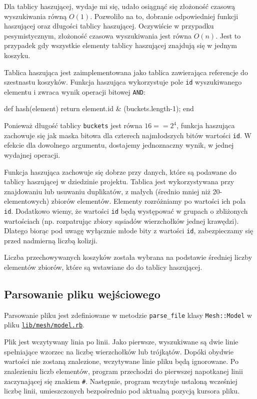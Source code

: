 \documentclass[10pt,a4paper]{article}
\newcommand{\f}[1]{\texttt{#1}}
\newcommand{\rev}{754330aa66a33e7434e6bda5c083aa3e12b7b65f}
\newcommand{\revhref}[1] {\href{https://github.com/student-tomasz/aisd-projekt-indywidualny/blob/\rev/#1}{\f{#1}}}
\begin{document}
Dla tablicy haszującej, wydaje mi się, udało osiągnąć się złożoność czasową
wyszukiwania równą $O(1)$. Pozwoliło na to, dobranie odpowiedniej funkcji
haszującej oraz długości tablicy haszującej. Oczywiście w przypadku
pesymistycznym, złożoność czasowa wyszukiwania jest równa $O(n)$. Jest to
przypadek gdy wszystkie elementy tablicy haszującej znajdują się w jednym
koszyku.

Tablica haszująca jest zaimplementowana jako tablica zawierająca referencje do
szestnastu koszyków. Funkcja haszująca wykorzystuje pole \f{id} wyszukiwanego
elementu i zwraca wynik operacji bitowej \f{AND}:

\begin{SmallVerbatim}
    def hash(element)
      return element.id & (buckets.length-1);
    end
\end{SmallVerbatim}

Ponieważ długość tablicy \f{buckets} jest równa $16 == 2^4$, funkcja haszująca
zachowuje się jak maska bitowa dla czterech najmłodszych bitów wartości
\f{id}. W efekcie dla dowolnego argumentu, dostajemy jednoznaczny wynik, w
jednej wydajnej operacji.

Funkcja haszująca zachowuje się dobrze przy danych, które są podawane do
tablicy haszującej w dziedzinie projektu. Tablica jest wykorzystywana przy
znajdowaniu lub usuwaniu duplikatów, z małych (średnio mniej niż
20-elementowych) zbiorów elementów. Elementy rozróżniamy po wartości ich pola
\f{id}. Dodatkowo wiemy, że wartości \f{id} będą występować w grupach o
zbliżonych wartościach (np. rozpatrując zbiory sąsiadów wierzchołków jednej
krawędzi). Dlatego biorąc pod uwagę wyłącznie młode bity z wartości \f{id},
zabezpieczamy się przed nadmierną liczbą kolizji.

Liczba przechowywanych koszyków została wybrana na podstawie średniej liczby
elementów zbiorów, które są wstawiane do do tablicy haszującej.


\subsection{Parsowanie pliku wejściowego}

Parsowanie pliku jest zdefiniowane w metodzie \f{parse\_file} klasy
\f{Mesh::Model} w pliku \revhref{lib/mesh/model.rb}.

Plik jest wczytywany linia po linii. Jako pierwsze, wyszukiwane są dwie linie
spełniające wzorzec na liczbę wierzchołków lub trójkątów. Dopóki obydwie
wartości nie zostaną znalezione, wczytywane linie pliku będą ignorowane. Po
znalezieniu liczb elementów, program przechodzi do pierwszej napotkanej linii
zaczynającej się znakiem \f{\#}. Następnie, program wczytuje ustaloną
wcześniej liczbę linii, umieszczonych bezpośrednio pod aktualną pozycją
kursora pliku.
\end{document}
